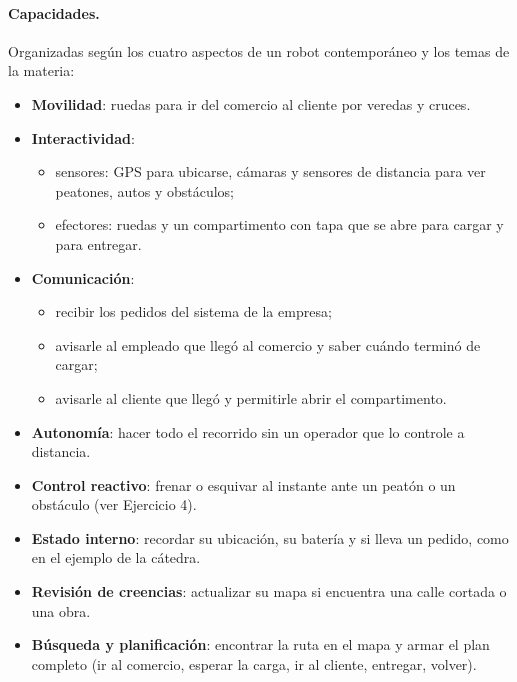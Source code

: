 \documentclass[11pt,a4paper]{article}
\begin{document}
\paragraph{Capacidades.} Organizadas según los cuatro aspectos de un robot contemporáneo y los temas de la materia:
\begin{itemize}
  \item \textbf{Movilidad}: ruedas para ir del comercio al cliente por veredas y cruces.
  \item \textbf{Interactividad}:
  \begin{itemize}
    \item sensores: GPS para ubicarse, cámaras y sensores de distancia para ver peatones, autos y obstáculos;
    \item efectores: ruedas y un compartimento con tapa que se abre para cargar y para entregar.
  \end{itemize}
  \item \textbf{Comunicación}:
  \begin{itemize}
    \item recibir los pedidos del sistema de la empresa;
    \item avisarle al empleado que llegó al comercio y saber cuándo terminó de cargar;
    \item avisarle al cliente que llegó y permitirle abrir el compartimento.
  \end{itemize}
  \item \textbf{Autonomía}: hacer todo el recorrido sin un operador que lo controle a distancia.
  \item \textbf{Control reactivo}: frenar o esquivar al instante ante un peatón o un obstáculo (ver Ejercicio 4).
  \item \textbf{Estado interno}: recordar su ubicación, su batería y si lleva un pedido, como en el ejemplo de la cátedra.
  \item \textbf{Revisión de creencias}: actualizar su mapa si encuentra una calle cortada o una obra.
  \item \textbf{Búsqueda y planificación}: encontrar la ruta en el mapa y armar el plan completo (ir al comercio, esperar la carga, ir al cliente, entregar, volver).
\end{itemize}
\end{document}
